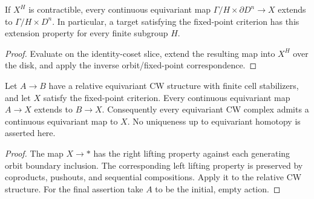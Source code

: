 \begin{proposition}\label{prop:contractible-orbit-cell-extension}
If $X^H$ is contractible, every continuous equivariant map
$\Gamma/H\times\partial D^n\to X$ extends to $\Gamma/H\times D^n$.
In particular, a target satisfying the fixed-point criterion has this
extension property for every finite subgroup $H$.
\end{proposition}
\begin{proof}
\leanok
Evaluate on the identity-coset slice, extend the resulting map into $X^H$
over the disk, and apply the inverse orbit/fixed-point correspondence.
\end{proof}

\begin{proposition}\label{prop:equivariant-cellular-extension}
Let $A\to B$ have a relative equivariant CW structure with finite cell
stabilizers, and let $X$ satisfy the fixed-point criterion. Every continuous
equivariant map $A\to X$ extends to $B\to X$.
Consequently every equivariant CW complex admits a continuous equivariant
map to $X$. No uniqueness up to equivariant homotopy is asserted here.
\end{proposition}
\begin{proof}
\leanok
The map $X\to *$ has the right lifting property against each generating
orbit boundary inclusion. The corresponding left lifting property is
preserved by coproducts, pushouts, and sequential compositions.
Apply it to the relative CW structure. For the final assertion take $A$
to be the initial, empty action.
\end{proof}


